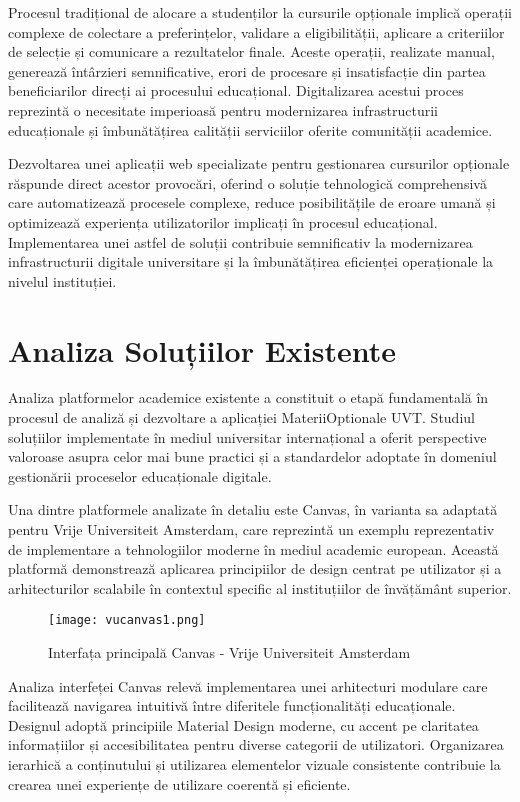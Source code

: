\documentclass[12pt,a4paper]{report}
\begin{document}
Procesul tradițional de alocare a studenților la cursurile opționale implică operații complexe de colectare a preferințelor, validare a eligibilității, aplicare a criteriilor de selecție și comunicare a rezultatelor finale. Aceste operații, realizate manual, generează întârzieri semnificative, erori de procesare și insatisfacție din partea beneficiarilor direcți ai procesului educațional. Digitalizarea acestui proces reprezintă o necesitate imperioasă pentru modernizarea infrastructurii educaționale și îmbunătățirea calității serviciilor oferite comunității academice.

Dezvoltarea unei aplicații web specializate pentru gestionarea cursurilor opționale răspunde direct acestor provocări, oferind o soluție tehnologică comprehensivă care automatizează procesele complexe, reduce posibilitățile de eroare umană și optimizează experiența utilizatorilor implicați în procesul educațional. Implementarea unei astfel de soluții contribuie semnificativ la modernizarea infrastructurii digitale universitare și la îmbunătățirea eficienței operaționale la nivelul instituției.

\section{Analiza Soluțiilor Existente}

Analiza platformelor academice existente a constituit o etapă fundamentală în procesul de analiză și dezvoltare a aplicației MateriiOptionale UVT. Studiul soluțiilor implementate în mediul universitar internațional a oferit perspective valoroase asupra celor mai bune practici și a standardelor adoptate în domeniul gestionării proceselor educaționale digitale.

Una dintre platformele analizate în detaliu este Canvas, în varianta sa adaptată pentru Vrije Universiteit Amsterdam, care reprezintă un exemplu reprezentativ de implementare a tehnologiilor moderne în mediul academic european. Această platformă demonstrează aplicarea principiilor de design centrat pe utilizator și a arhitecturilor scalabile în contextul specific al instituțiilor de învățământ superior.

\begin{figure}[H]
\centering
\texttt{[image: vucanvas1.png]}
\caption{Interfața principală Canvas - Vrije Universiteit Amsterdam}
\label{fig:canvas1}
\end{figure}

Analiza interfeței Canvas relevă implementarea unei arhitecturi modulare care facilitează navigarea intuitivă între diferitele funcționalități educaționale. Designul adoptă principiile Material Design moderne, cu accent pe claritatea informațiilor și accesibilitatea pentru diverse categorii de utilizatori. Organizarea ierarhică a conținutului și utilizarea elementelor vizuale consistente contribuie la crearea unei experiențe de utilizare coerentă și eficiente.
\end{document}
